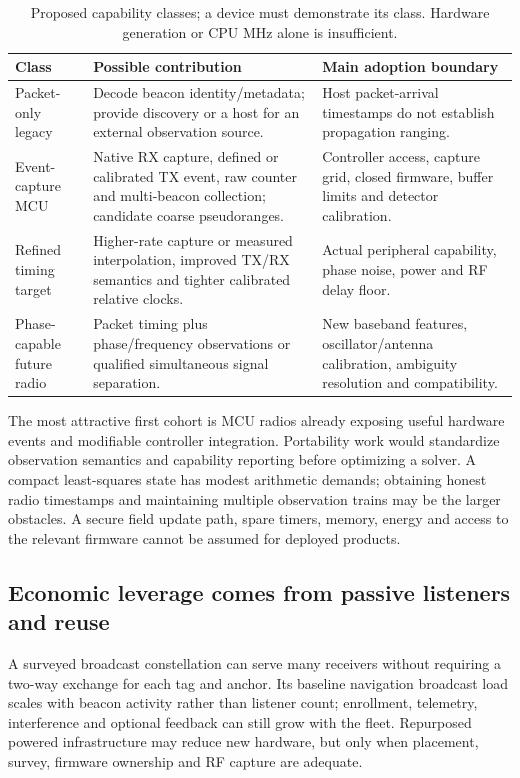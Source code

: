 \documentclass[11pt,letterpaper]{article}
\begin{document}
\begin{table}[ht]\centering\small
\caption{Proposed capability classes; a device must demonstrate its class. Hardware generation or CPU MHz alone is insufficient.}\label{tab:classes}
\begin{tabular}{@{}L{33mm}L{57mm}L{55mm}@{}}\toprule
Class & Possible contribution & Main adoption boundary\\\midrule
Packet-only legacy &Decode beacon identity/metadata; provide discovery or a host for an external observation source. &Host packet-arrival timestamps do not establish propagation ranging.\\\addlinespace
Event-capture MCU &Native RX capture, defined or calibrated TX event, raw counter and multi-beacon collection; candidate coarse pseudoranges. &Controller access, capture grid, closed firmware, buffer limits and detector calibration.\\\addlinespace
Refined timing target &Higher-rate capture or measured interpolation, improved TX/RX semantics and tighter calibrated relative clocks. &Actual peripheral capability, phase noise, power and RF delay floor.\\\addlinespace
Phase-capable future radio &Packet timing plus phase/frequency observations or qualified simultaneous signal separation. &New baseband features, oscillator/antenna calibration, ambiguity resolution and compatibility.\\\bottomrule
\end{tabular}
\end{table}

The most attractive first cohort is MCU radios already exposing useful hardware events and modifiable controller integration. Portability work would standardize observation semantics and capability reporting before optimizing a solver. A compact least-squares state has modest arithmetic demands; obtaining honest radio timestamps and maintaining multiple observation trains may be the larger obstacles. A secure field update path, spare timers, memory, energy and access to the relevant firmware cannot be assumed for deployed products.

\subsection{Economic leverage comes from passive listeners and reuse}
A surveyed broadcast constellation can serve many receivers without requiring a two-way exchange for each tag and anchor. Its baseline navigation broadcast load scales with beacon activity rather than listener count; enrollment, telemetry, interference and optional feedback can still grow with the fleet. Repurposed powered infrastructure may reduce new hardware, but only when placement, survey, firmware ownership and RF capture are adequate.
\end{document}
